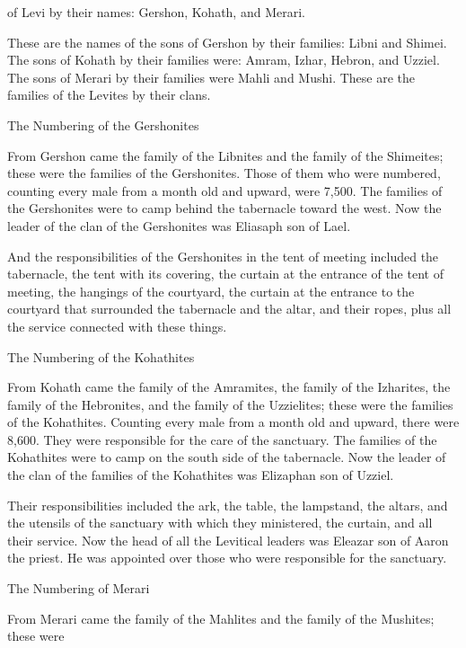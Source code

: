{of Levi
by their names: Gershon,
Kohath,
and Merari.
\par }{\PP {}These
are the names
of the sons
of Gershon
by their families: Libni
and Shimei.
The sons
of Kohath
by their families
were: Amram,
Izhar,
Hebron,
and Uzziel.
The sons
of Merari
by their families
were Mahli
and Mushi.
These
are the families
of the Levites
by their clans.
\par }{\SH The Numbering of the Gershonites
\par }{\PP {}From Gershon
came the family
of the Libnites
and the family
of the Shimeites;
these
were
the families
of the Gershonites.
Those of them who were numbered,
counting
every
male
from a month
old and upward,
were 7,500.
The families
of the Gershonites
were to camp
behind
the tabernacle
toward the west.
Now the leader
of the clan
of the Gershonites
was Eliasaph
son
of Lael.
\par }{\PP {}And the responsibilities
of the Gershonites
in the tent
of meeting
included the tabernacle,
the tent
with its covering,
the curtain
at the entrance
of the tent
of meeting,
the hangings
of the courtyard,
the curtain
at the entrance
to the courtyard
that
surrounded
the
tabernacle
and the altar,
and their ropes,
plus all
the service
connected with these things.
\par }{\SH The Numbering of the Kohathites
\par }{\PP {}From Kohath
came the family
of the Amramites,
the family
of the Izharites,
the family
of the Hebronites,
and the family
of the Uzzielites;
these
were
the families
of the Kohathites.
Counting
every
male
from a month
old and upward,
there were 8,600.
They were responsible
for the care
of the sanctuary.
The families
of the Kohathites
were to camp
on
the south
side
of the tabernacle.
Now the leader
of the clan
of the families
of the Kohathites
was Elizaphan
son
of Uzziel.
\par }{\PP {}Their responsibilities
included the ark,
the table,
the lampstand,
the altars,
and the utensils
of the sanctuary
with which
they ministered,
the curtain,
and all
their service.
Now the head of all the Levitical
leaders
was Eleazar
son
of Aaron
the priest.
He was appointed over
those who
were responsible
for the sanctuary.
\par }{\SH The Numbering of Merari
\par }{\PP {}From Merari
came the family
of the Mahlites
and the family
of the Mushites;
these
were
}
